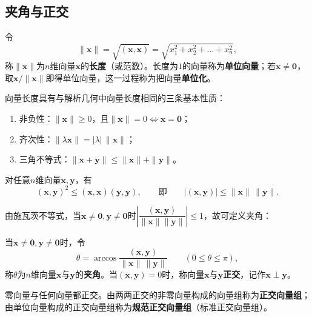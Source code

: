 \subsection{夹角与正交}
\begin{definition}[长度、单位向量]
令
\[
\|\boldsymbol{x}\|=\sqrt{(\boldsymbol{x},\boldsymbol{x})}=\sqrt{x_1^2+x_2^2+\dots+x_n^2},
\]
称$\|\boldsymbol{x}\|$为$n$维向量$\boldsymbol{x}$的\textbf{长度}（或范数）。长度为$1$的向量称为\textbf{单位向量}；若$\boldsymbol{x}\ne\boldsymbol{0}$，取$\boldsymbol{x}/\|\boldsymbol{x}\|$即得单位向量，这一过程称为把向量\textbf{单位化}。
\end{definition}

向量长度具有与解析几何中向量长度相同的三条基本性质：
\begin{enumerate}
    \item 非负性：$\|\boldsymbol{x}\|\ge0$，且$\|\boldsymbol{x}\|=0\iff\boldsymbol{x}=\boldsymbol{0}$；
    \item 齐次性：$\|\lambda\boldsymbol{x}\|=|\lambda|\,\|\boldsymbol{x}\|$；
    \item 三角不等式：$\|\boldsymbol{x}+\boldsymbol{y}\|\le\|\boldsymbol{x}\|+\|\boldsymbol{y}\|$。
\end{enumerate}

\begin{theorem}[施瓦茨不等式]
对任意$n$维向量$\boldsymbol{x},\boldsymbol{y}$，有
\[
(\boldsymbol{x},\boldsymbol{y})^{2}\le(\boldsymbol{x},\boldsymbol{x})(\boldsymbol{y},\boldsymbol{y}),
\qquad\text{即}\qquad
|(\boldsymbol{x},\boldsymbol{y})|\le\|\boldsymbol{x}\|\,\|\boldsymbol{y}\|.
\]
\end{theorem}

由施瓦茨不等式，当$\boldsymbol{x}\ne\boldsymbol{0},\boldsymbol{y}\ne\boldsymbol{0}$时$\left|\dfrac{(\boldsymbol{x},\boldsymbol{y})}{\|\boldsymbol{x}\|\|\boldsymbol{y}\|}\right|\le1$，故可定义夹角：

\begin{definition}[夹角、正交]
当$\boldsymbol{x}\ne\boldsymbol{0},\boldsymbol{y}\ne\boldsymbol{0}$时，令
\[
\theta=\arccos\frac{(\boldsymbol{x},\boldsymbol{y})}{\|\boldsymbol{x}\|\,\|\boldsymbol{y}\|}
\qquad(0\le\theta\le\pi),
\]
称$\theta$为$n$维向量$\boldsymbol{x}$与$\boldsymbol{y}$的\textbf{夹角}。当$(\boldsymbol{x},\boldsymbol{y})=0$时，称向量$\boldsymbol{x}$与$\boldsymbol{y}$\textbf{正交}，记作$\boldsymbol{x}\perp\boldsymbol{y}$。
\end{definition}

零向量与任何向量都正交。由两两正交的非零向量构成的向量组称为\textbf{正交向量组}；由单位向量构成的正交向量组称为\textbf{规范正交向量组}（标准正交向量组）。

